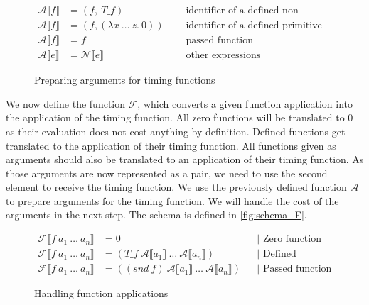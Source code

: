 \begin{figure}
  \begin{align*}
    \mathcal{A}\llbracket f\rrbracket &= (f,\ T\_f) &&\text{| identifier of a defined non-primitive function}\\
    \mathcal{A}\llbracket f\rrbracket &= (f, (\lambda x\ \dots\ z.\ 0)) &&\text{| identifier of a defined primitive function}\\
    \mathcal{A}\llbracket f\rrbracket &= f &&\text{| passed function}\\
    \mathcal{A}\llbracket e\rrbracket &= \mathcal{N}\llbracket e\rrbracket &&\text{| other expressions}
  \end{align*}
  \caption{Preparing arguments for timing functions}
  \label{fig:schema_A}
\end{figure}

We now define the function $\mathcal{F}$, which converts a given function application into the application of the timing function.
All zero functions will be translated to $0$ as their evaluation does not cost anything by definition.
Defined functions get translated to the application of their timing function.
All functions given as arguments should also be translated to an application of their timing function.
As those arguments are now represented as a pair, we need to use the second element to receive the timing function.
We use the previously defined function $\mathcal{A}$ to prepare arguments for the timing function.
We will handle the cost of the arguments in the next step.
The schema is defined in \autoref{fig:schema_F}.
\begin{figure}
\begin{align*}
  \mathcal{F}\llbracket f\ a_{1}\ \dots\ a_{n}\rrbracket &= 0 &&\text{| Zero function}\\
  \mathcal{F}\llbracket f\ a_{1}\ \dots\ a_{n}\rrbracket &= (T\_f\ \mathcal{A}\llbracket a_{1}\rrbracket\ \dots\ \mathcal{A}\llbracket a_{n}\rrbracket) &&\text{| Defined function}\\
  \mathcal{F}\llbracket f\ a_{1}\ \dots\ a_{n}\rrbracket &= ((snd\ f)\ \mathcal{A}\llbracket a_{1}\rrbracket\ \dots\ \mathcal{A}\llbracket a_{n}\rrbracket) &&\text{| Passed function}
\end{align*}
\caption{Handling function applications}
\label{fig:schema_F}
\end{figure}

